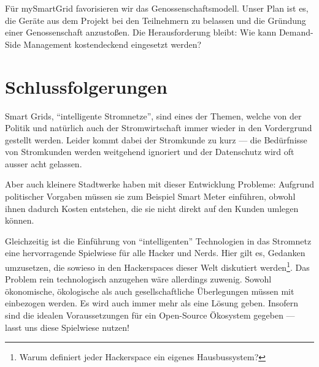 \documentclass[12pt,BCOR=8.5mm]{scrartcl}
\begin{document}
Für mySmartGrid favorisieren wir das Genossenschaftsmodell. Unser Plan
ist es, die Geräte aus dem Projekt bei den Teilnehmern zu belassen und
die Gründung einer Genossenschaft anzustoßen. Die Herausforderung
bleibt: Wie kann Demand-Side Management kostendeckend eingesetzt werden?

\section{Schlussfolgerungen}
Smart Grids, "`intelligente Stromnetze"', sind eines der Themen, welche
von der Politik und natürlich auch der Stromwirtschaft immer wieder in
den Vordergrund gestellt werden. Leider kommt dabei der Stromkunde zu
kurz --- die Bedürfnisse von Stromkunden werden weitgehend ignoriert und
der Datenschutz wird oft ausser acht gelassen.

Aber auch kleinere Stadtwerke haben mit dieser Entwicklung Probleme:
Aufgrund politischer Vorgaben müssen sie zum Beispiel Smart Meter
einführen, obwohl ihnen dadurch Kosten entstehen, die sie nicht direkt
auf den Kunden umlegen können. 

Gleichzeitig ist die Einführung von "`intelligenten"' Technologien in
das Stromnetz eine hervorragende Spielwiese für alle Hacker und Nerds.
Hier gilt es, Gedanken umzusetzen, die sowieso in den Hackerspaces
dieser Welt diskutiert werden\footnote{Warum definiert jeder Hackerspace
ein eigenes Hausbussystem?}. Das Problem rein technologisch anzugehen
wäre allerdings zuwenig. Sowohl ökonomische, ökologische als auch
gesellschaftliche Überlegungen müssen mit einbezogen werden. Es wird
auch immer mehr als eine Lösung geben. Insofern sind die idealen
Voraussetzungen für ein Open-Source Ökosystem gegeben --- lasst uns diese
Spielwiese nutzen!

\cite{geller2010smartgrid}


%
%
%
%
%
%


\end{document}
